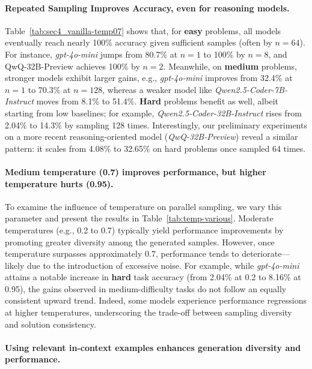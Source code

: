 \paragraph{Repeated Sampling Improves Accuracy, even for reasoning models.}
Table~\ref{tab:sec4_vanilla-temp07} shows that, for \textbf{easy} problems, all models eventually reach nearly 100\% accuracy given sufficient samples (often by \(n=64\)). For instance, \textit{gpt-4o-mini} jumps from 80.7\% at \(n=1\) to 100\% by \(n=8\), and QwQ-32B-Preview achieves 100\% by \(n=2\). Meanwhile, on \textbf{medium} problems, stronger models exhibit larger gains, e.g., \textit{gpt-4o-mini} improves from 32.4\% at \(n=1\) to 70.3\% at \(n=128\), whereas a weaker model like \textit{Qwen2.5-Coder-7B-Instruct} moves from 8.1\% to 51.4\%. \textbf{Hard} problems benefit as well, albeit starting from low baselines; for example, \textit{Qwen2.5-Coder-32B-Instruct} rises from 2.04\% to 14.3\% by sampling 128 times. Interestingly, our preliminary experiments on a more recent reasoning-oriented model (\textit{QwQ-32B-Preview}) reveal a similar pattern: it scales from 4.08\% to 32.65\% on hard problems once sampled 64 times.

\paragraph{Medium temperature (0.7) improves performance, but higher temperature hurts (0.95).} To examine the influence of temperature on parallel sampling, we vary this parameter and present the results in Table~\ref{tab:temp-various}. Moderate temperatures (e.g., 0.2 to 0.7) typically yield performance improvements by promoting greater diversity among the generated samples. However, once temperature surpasses approximately 0.7, performance tends to deteriorate—likely due to the introduction of excessive noise. For example, while \textit{gpt-4o-mini} attains a notable increase in \textbf{hard} task accuracy (from 2.04\% at 0.2 to 8.16\% at 0.95), the gains observed in medium-difficulty tasks do not follow an equally consistent upward trend. Indeed, some models experience performance regressions at higher temperatures, underscoring the trade-off between sampling diversity and solution consistency.

\paragraph{Using relevant in-context examples enhances generation diversity and performance.} 

